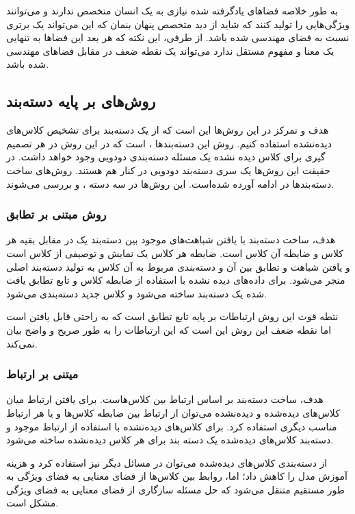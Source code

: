 به طور خلاصه فضاهای یادگرفته شده نیازی به یک انسان متخصص ندارند و می‌توانند ویژگی‌هایی را تولید کنند که شاید از دید متخصص پنهان بنمان که این می‌تواند یک برتری نسبت به فضای مهندسی شده باشد. از طرفی، این نکته که هر بعد این فضاها به تنهایی یک معنا و مفهوم مستقل ندارد می‌تواند یک نقطه ضعف در مقابل فضاهای مهندسی شده باشد.

\subsection{روش‌‌های بر پایه دسته‌بند}
هدف و تمرکز در این روش‌ها این است که از یک دسته‌بند برای تشخیص کلاس‌های دیده‌نشده استفاده کنیم. روش این دسته‌بند‌ها 
،  
است که در این روش در هر تصمیم گیری برای کلاس دیده نشده یک مسئله دسته‌بندی دودویی وجود خواهد داشت. در حقیقت این روش‌ها یک سری دسته‌بند دودویی در کنار هم هستند. روش‌های ساخت دسته‌بند‌ها در ادامه آورده شده‌است. این روش‌ها در سه دسته 
، 
 و 
بررسی می‌شوند.

\subsubsection{‌روش مبتنی بر تطابق}
هدف، ساخت دسته‌بند با یافتن شباهت‌های موجود بین دسته‌بند یک در مقابل بقیه هر کلاس و ضابطه آن کلاس است. ضابطه هر کلاس یک نمایش و توصیفی از کلاس است و یافتن شباهت و تطابق بین آن و دسته‌بندی مربوط به آن کلاس به تولید دسته‌بند اصلی منجر می‌شود. برای داده‌های دیده نشده با استفاده از ضابطه کلاس و تابع تطابق یافت شده یک دسته‌بند ساخته می‌شود و کلاس جدید دسته‌بندی می‌شود.

نتطه قوت این روش ارتباطات بر پایه تابع تطابق است که به راحتی قابل یافتن است اما نقطه ضعف این روش این است که این ارتباطات را به طور صریح و واضح بیان نمی‌کند.

\subsubsection{‌میتنی بر ارتباط}
هدف، ساخت دسته‌بند بر اساس ارتباط بین کلاس‌هاست. برای یافتن ارتباط میان کلاس‌های دیده‌شده و دیده‌نشده می‌توان از ارتباط بین ضابطه کلاس‌ها و یا هر ارتباط مناسب دیگری استفاده کرد. برای کلاس‌های دیده‌نشده با استفاده از ارتباط موجود و دسته‌بند کلاس‌های دیده‌شده یک دسته بند برای هر کلاس دیده‌نشده ساخته می‌شود.

از دسته‌بندی کلاس‌های دیده‌شده می‌توان در مسائل دیگر نیز استفاده کرد و هزینه آموزش مدل را کاهش داد؛ اما، روابط بین کلاس‌ها از فضای معنایی به فضای ویژگی به طور مستقیم متنقل می‌شود که حل مسئله سازگاری از فضای معنایی به فضای ویژگی مشکل است.

